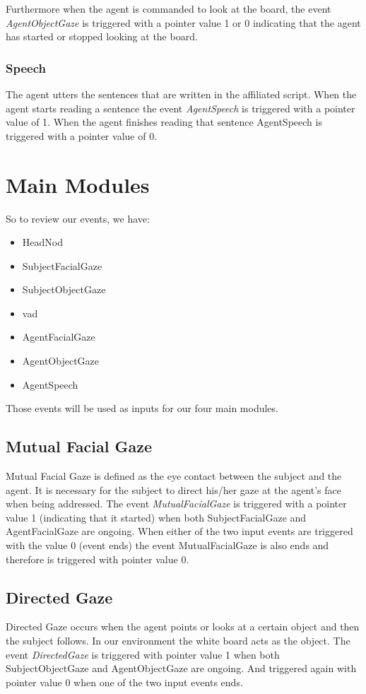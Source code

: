 \documentclass[12pt, a4paper, fleqn]{memoir}%
\begin{document}
Furthermore when the agent is commanded to look at the board, the event \textit{AgentObjectGaze} is triggered with a pointer value 1 or 0 indicating that the agent has started or stopped looking at the board.

\subsection{Speech}
The agent utters the sentences that are written in the affiliated script. When the agent starts reading a sentence the event \textit{AgentSpeech} is triggered with a pointer value of 1. When the agent finishes reading that sentence AgentSpeech is triggered with a pointer value of 0.

\chapter{Main Modules}
\label{chap:MainModules}
So to review our events, we have:

\begin{itemize}
  \item HeadNod
  \item SubjectFacialGaze
  \item SubjectObjectGaze
  \item vad
  \item AgentFacialGaze
  \item AgentObjectGaze
  \item AgentSpeech
\end{itemize}

Those events will be used as inputs for our four main modules.

\section{Mutual Facial Gaze}
\label{sec:MutualFacialGaze}
Mutual Facial Gaze is defined as the eye contact between the subject and the agent. It is necessary for the subject to direct his/her gaze at the agent's face when being addressed. The event \textit{MutualFacialGaze} is triggered with a pointer value 1 (indicating that it started) when both SubjectFacialGaze and AgentFacialGaze are ongoing. When either of the two input events are triggered with the value 0 (event ends) the event MutualFacialGaze is also ends and therefore is triggered with pointer value 0.

\section{Directed Gaze}
\label{sec:DirectedGaze}
Directed Gaze occurs when the agent points or looks at a certain object and then the subject follows. In our environment the white board acts as the object. The event \textit{DirectedGaze} is triggered with pointer value 1 when both SubjectObjectGaze and AgentObjectGaze are ongoing. And triggered again with pointer value 0 when one of the two input events ends.
\end{document}

